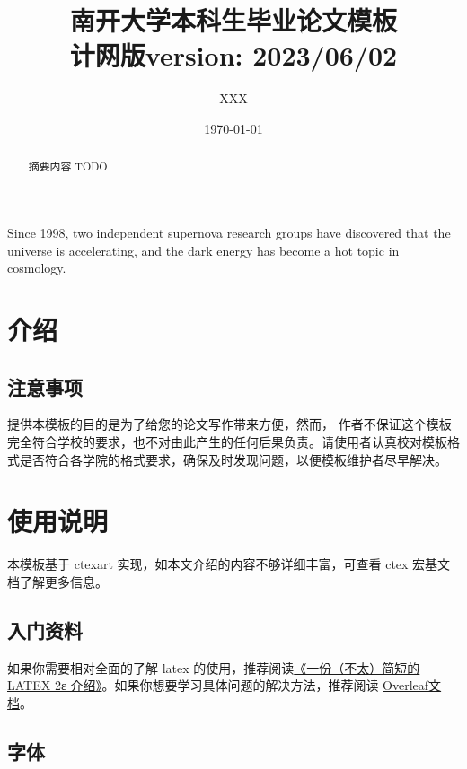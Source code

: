 \documentclass{nktba}
\title{南开大学本科生毕业论文模板 \\ 计网版}
\title*{version: 2023/06/02}
\author{XXX}
\date{\today}
\begin{document}
\maketitle

\begin{abstract}
摘要内容 TODO
\end{abstract}
  
\begin{abstract*}
Since 1998, two independent supernova research groups have discovered that the universe is accelerating, and the dark energy has become a hot topic in cosmology. 
\end{abstract*}

\tableofcontents

\section{介绍}

\subsection{注意事项}

提供本模板的目的是为了给您的论文写作带来方便，然而，
作者不保证这个模板完全符合学校的要求，也不对由此产生的任何后果负责。请使用者认真校对模板格式是否符合各学院的格式要求，确保及时发现问题，以便模板维护者尽早解决。



\section{使用说明} \label{chpt:A}

本模板基于 ctexart 实现，如本文介绍的内容不够详细丰富，可查看 ctex 宏基文档了解更多信息。

\subsection{入门资料}

如果你需要相对全面的了解 latex 的使用，推荐阅读\href{http://mirrors.ctan.org/info/lshort/chinese/lshort-zh-cn.pdf}{《一份（不太）简短的 LATEX 2ε 介绍》}。如果你想要学习具体问题的解决方法，推荐阅读 \href{https://www.overleaf.com/learn}{Overleaf文档}。

\subsection{字体}
\end{document}
